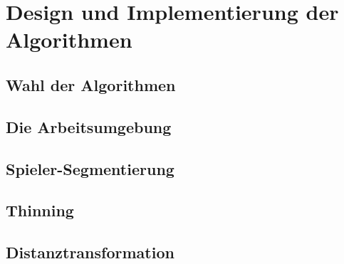 \chapter{Design und Implementierung der Algorithmen}
\section{Wahl der Algorithmen}
\section{Die Arbeitsumgebung}
\section{Spieler-Segmentierung}
\section{Thinning}
\section{Distanztransformation}
